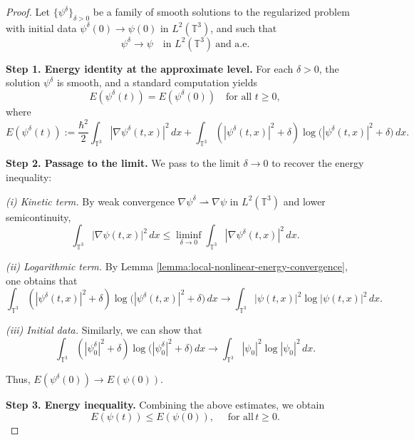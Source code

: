 \documentclass[10pt,a4paper]{amsart}
\begin{document}
\begin{proof}
Let $\{\psi^\delta\}_{\delta>0}$ be a family of smooth solutions to the regularized problem
with  initial data $\psi^\delta(0)\to \psi(0)$ in $L^2(\mathbb{T}^3)$, and such that
\[
\psi^\delta \to \psi \quad \text{in } L^2(\mathbb{T}^3) \ \text{and a.e.}
\]

\medskip

\noindent
\textbf{Step 1. Energy identity at the approximate level.}
For each $\delta>0$, the solution $\psi^\delta$ is smooth, and a standard computation yields
\[
E(\psi^\delta(t))
=
E(\psi^\delta(0))
\quad \text{for all } t\ge 0,
\]
where
\[
E(\psi^\delta(t))
:=
\frac{\hbar^2}{2}\int_{\mathbb{T}^3} |\nabla \psi^\delta(t,x)|^2\,dx
+
\int_{\mathbb{T}^3}( |\psi^\delta(t,x)|^2+\delta) \log\big(|\psi^\delta(t,x)|^2+\delta\big)\,dx.
\]
\medskip

\noindent
\textbf{Step 2. Passage to the limit.} We pass to the limit $\delta\to 0$ to recover the energy inequality:

\medskip

\noindent
\emph{(i) Kinetic term.}
By weak convergence $\nabla \psi^\delta \rightharpoonup \nabla \psi$ in $L^2(\mathbb{T}^3)$ and lower semicontinuity,
\[
\int_{\mathbb{T}^3 }|\nabla \psi(t,x)|^2\,dx
\leq
\liminf_{\delta\to 0}
\int_{\mathbb{T}^3} |\nabla \psi^\delta(t,x)|^2\,dx.
\]

\medskip

\noindent
\emph{(ii) Logarithmic term.}
By Lemma \ref{lemma:local-nonlinear-energy-convergence},  one obtains that 
\[
\int_{\mathbb{T}^3} (|\psi^\delta(t,x)|^2+\delta) \log\big(|\psi^\delta(t,x)|^2+\delta\big)\,dx\to \int_{\mathbb{T}^3} |\psi(t,x)|^2 \log |\psi(t,x)|^2\,dx.
\]

\medskip

\noindent
\emph{(iii) Initial data.}
Similarly, we can show that \[
\int_{\mathbb{T}^3} (|\psi^\delta_{0}|^2+\delta) \log\big(|\psi^\delta_{0}|^2+\delta\big)\,dx\to \int_{\mathbb{T}^3}|\psi_0|^2 \log |\psi_0|^2\,dx.
\]

Thus, 
$
E(\psi^\delta(0))
\to
E(\psi(0)).
$

\medskip

\noindent
\textbf{Step 3. Energy inequality.} Combining the above estimates, we obtain
\begin{equation}
\label{energy inequality}
E(\psi(t))\leq 
E(\psi(0)),\quad\text{ for all} \,t\geq 0.
\end{equation}
\medskip








\end{proof}
\end{document}
